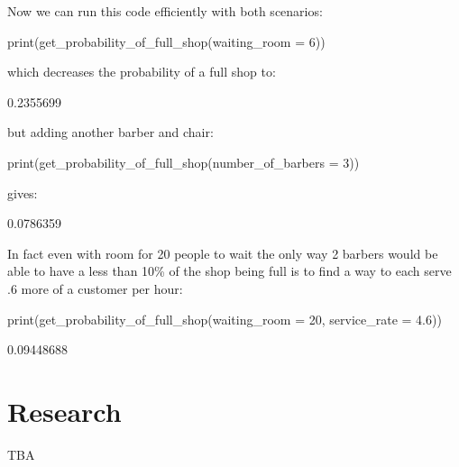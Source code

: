 Now we can run this code efficiently with both scenarios:

\begin{Rin}
print(get_probability_of_full_shop(waiting_room = 6))
\end{Rin}

which decreases the probability of a full shop to:

\begin{Rout}
[1] 0.2355699
\end{Rout}

but adding another barber and chair:

\begin{Rin}
print(get_probability_of_full_shop(number_of_barbers = 3))
\end{Rin}

gives:

\begin{Rout}
[1] 0.0786359
\end{Rout}

In fact even with room for 20 people to wait the only way 2 barbers would be
able to have a less than 10\% of the shop being full is to find a way to each
serve .6 more of a customer per hour:

\begin{Rin}
print(get_probability_of_full_shop(waiting_room = 20, service_rate = 4.6))
\end{Rin}

\begin{Rout}
[1] 0.09448688
\end{Rout}

\section{Research}\label{sec:research}

TBA
